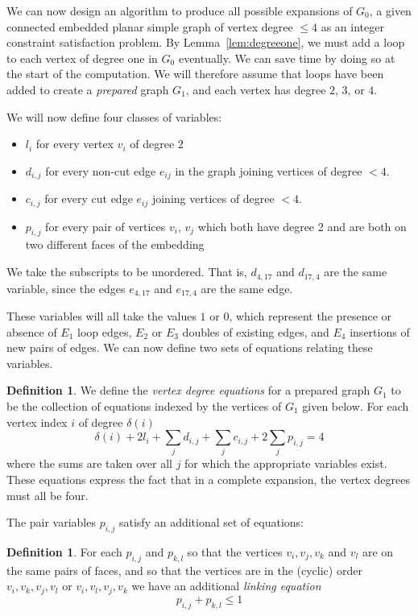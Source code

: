 \documentclass[amsmath,secnumarabic,amssymb,floatfix,nofootinbib,nobibnotes,letterpaper,11pt,tightenlines,showkeys]{revtex4}
\theoremstyle{definition}
\newtheorem{definition}[theorem]{Definition}
\newcommand{\loopinsert}{E_1}
\newcommand{\edgedouble}{E_2}
\newcommand{\cutedgedouble}{E_3}
\newcommand{\pairinsert}{E_4}
\begin{document}
We can now design an algorithm to produce all possible expansions of $G_0$, a given connected embedded planar simple graph of vertex degree $\leq 4$ as an integer constraint satisfaction problem. By Lemma~\ref{lem:degreeone}, we must add a loop to each vertex of degree one in $G_0$ eventually. We can save time by doing so at the start of the computation. We will therefore assume that loops have been added to create a \emph{prepared} graph $G_1$, and each vertex has degree $2$, $3$, or $4$.

We will now define four classes of variables:
\begin{itemize}
\item $l_{i}$ for every vertex $v_i$ of degree $2$
\item $d_{i,j}$ for every non-cut edge $e_{ij}$ in the graph joining vertices of degree $<4$.
\item $c_{i,j}$ for every cut edge $e_{ij}$ joining vertices of degree $<4$.
\item $p_{i,j}$ for every pair of vertices $v_{i}$, $v_j$ which both have degree 2 and are both on two different faces of the embedding
\end{itemize}
We take the subscripts to be unordered. That is, $d_{4,17}$ and $d_{17,4}$ are the same variable, since the edges $e_{4,17}$ and $e_{17,4}$ are the same edge.

These variables will all take the values $1$ or $0$, which represent the presence or absence of $\loopinsert$ loop edges, $\edgedouble$ or $\cutedgedouble$ doubles of existing edges, and $\pairinsert$ insertions of new pairs of edges.
We can now define two sets of equations relating these variables.

\begin{definition}
We define the \emph{vertex degree equations} for a prepared graph $G_1$ to be the collection of equations indexed by the vertices of $G_1$ given below. For each vertex index $i$ of degree $\delta(i)$
\begin{equation*}
\delta(i) + 2 l_i + \sum_j d_{i,j} + \sum_j c_{i,j} + 2 \sum_j p_{i,j} = 4
\end{equation*}
where the sums are taken over all $j$ for which the appropriate variables exist. These equations express the fact that in a complete expansion, the vertex degrees must all be four.
\end{definition}

The pair variables $p_{i,j}$ satisfy an additional set of equations:
\begin{definition}
For each $p_{i,j}$ and $p_{k,l}$ so that the vertices $v_i, v_j, v_k$ and $v_l$ are on the same pairs of faces, and so that the vertices are in the (cyclic) order $v_i, v_k, v_j, v_l$ or $v_i, v_l, v_j, v_k$ we have an additional \emph{linking equation}
\begin{equation*}
p_{i,j} + p_{k,l} \leq 1
\end{equation*}
\end{definition}
\end{document}
